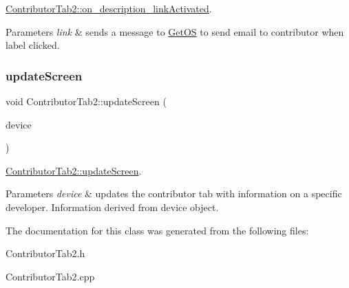 \hyperlink{classContributorTab2_a22fb06bbd151a407ff40404897cabb4d}{Contributor\+Tab2\+::on\+\_\+description\+\_\+link\+Activated}. 


\begin{DoxyParams}{Parameters}
{\em link} & sends a message to \hyperlink{classGetOS}{Get\+OS} to send email to contributor when label clicked. \\
\hline
\end{DoxyParams}
\mbox{\label{classContributorTab2_abf252c3c3cacdc4a4d1f369ffd4fbb99}} 
\subsubsection{\texorpdfstring{update\+Screen}{updateScreen}}
{\footnotesize\ttfamily void Contributor\+Tab2\+::update\+Screen (\begin{DoxyParamCaption}\item[{\hyperlink{classDevice}{Device}}]{device }\end{DoxyParamCaption})\hspace{0.3cm}{\ttfamily [slot]}}



\hyperlink{classContributorTab2_abf252c3c3cacdc4a4d1f369ffd4fbb99}{Contributor\+Tab2\+::update\+Screen}. 


\begin{DoxyParams}{Parameters}
{\em device} & updates the contributor tab with information on a specific developer. Information derived from device object. \\
\hline
\end{DoxyParams}


The documentation for this class was generated from the following files\+:\begin{DoxyCompactItemize}
\item 
Contributor\+Tab2.\+h\item 
Contributor\+Tab2.\+cpp\end{DoxyCompactItemize}
